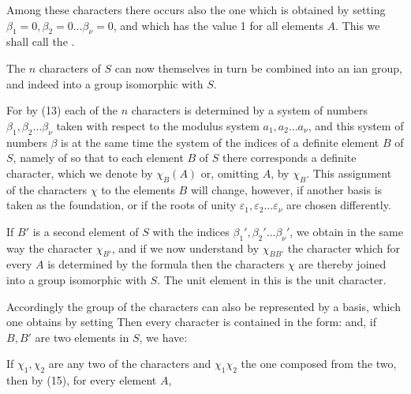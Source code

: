 
Among these characters there occurs also the one which is obtained by setting $\beta_1 = 0, \beta_2 = 0 \ldots \beta_\nu = 0$, and which has the value 1 for all elements $A$. This we shall call the .

The $n$ characters of $S$ can now themselves in turn be combined into an ian group, and indeed into a group isomorphic with $S$.

For by (13) each of the $n$ characters is determined by a system of numbers $\beta_1, \beta_2 \ldots \beta_\nu$ taken with respect to the modulus system $a_1, a_2 \ldots a_\nu$, and this system of numbers $\beta$ is at the same time the system of the indices of a definite element $B$ of $S$, namely of
so that to each element $B$ of $S$ there corresponds a definite character, which we denote by $\chi_B(A)$ or, omitting $A$, by $\chi_B$. This assignment of the characters $\chi$ to the elements $B$ will change, however, if another basis is taken as the foundation, or if the roots of unity $\varepsilon_1, \varepsilon_2 \ldots \varepsilon_\nu$ are chosen differently.

If $B'$ is a second element of $S$ with the indices $\beta_1', \beta_2' \ldots \beta_\nu'$, we obtain in the same way the character $\chi_{B'}$, and if we now understand by $\chi_{BB'}$ the character which for every $A$ is determined by the formula
then the characters $\chi$ are thereby joined into a group isomorphic with $S$. The unit element in this  is the unit character.

Accordingly the group of the characters can also be represented by a basis, which one obtains by setting
Then every character is contained in the form:
and, if $B, B'$ are two elements in $S$, we have:

If $\chi_1, \chi_2$ are any two of the characters and $\chi_1\chi_2$ the one composed from the two, then by (15), for every element $A$,
